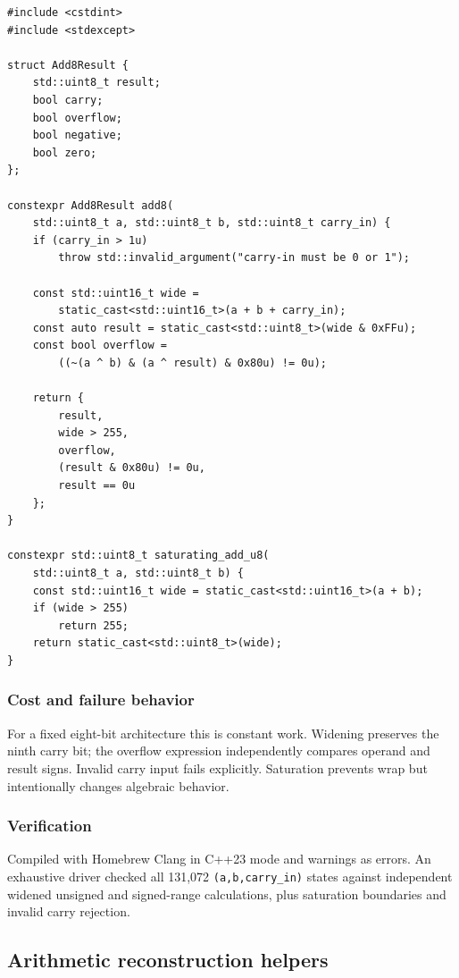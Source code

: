 \begin{verbatim}
#include <cstdint>
#include <stdexcept>

struct Add8Result {
    std::uint8_t result;
    bool carry;
    bool overflow;
    bool negative;
    bool zero;
};

constexpr Add8Result add8(
    std::uint8_t a, std::uint8_t b, std::uint8_t carry_in) {
    if (carry_in > 1u)
        throw std::invalid_argument("carry-in must be 0 or 1");

    const std::uint16_t wide =
        static_cast<std::uint16_t>(a + b + carry_in);
    const auto result = static_cast<std::uint8_t>(wide & 0xFFu);
    const bool overflow =
        ((~(a ^ b) & (a ^ result) & 0x80u) != 0u);

    return {
        result,
        wide > 255,
        overflow,
        (result & 0x80u) != 0u,
        result == 0u
    };
}

constexpr std::uint8_t saturating_add_u8(
    std::uint8_t a, std::uint8_t b) {
    const std::uint16_t wide = static_cast<std::uint16_t>(a + b);
    if (wide > 255)
        return 255;
    return static_cast<std::uint8_t>(wide);
}
\end{verbatim}

\subsubsection{Cost and failure behavior}\label{appendix-4e2236f53445-cost-and-failure-behavior-1}

For a fixed eight-bit architecture this is constant work. Widening preserves the ninth carry bit; the overflow expression independently compares operand and result signs. Invalid carry input fails explicitly. Saturation prevents wrap but intentionally changes algebraic behavior.

\subsubsection{Verification}\label{appendix-4e2236f53445-verification-1}

Compiled with Homebrew Clang in C++23 mode and warnings as errors. An exhaustive driver checked all 131,072 \texttt{(a,b,carry\_in)} states against independent widened unsigned and signed-range calculations, plus saturation boundaries and invalid carry rejection.

\subsection{Arithmetic reconstruction helpers}\label{appendix-4e2236f53445-arithmetic-reconstruction-helpers}

